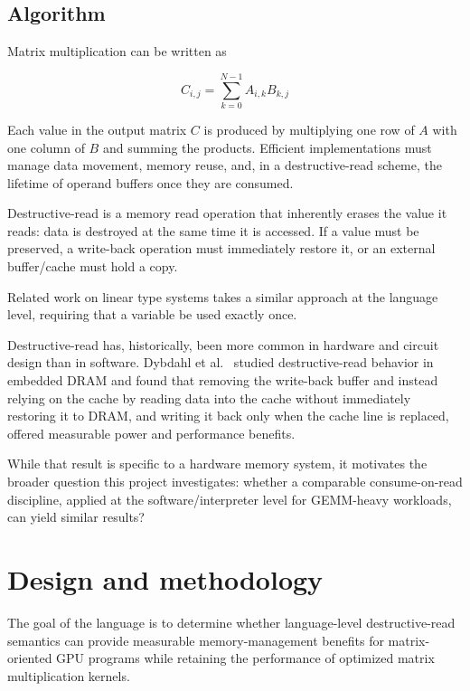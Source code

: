\documentclass[a4paper]{article}
\begin{document}
	\subsection{Algorithm}
	
	Matrix multiplication can be written as
	
	\begin{equation}
		C_{i,j} = \sum_{k=0}^{N-1} A_{i,k}B_{k,j}
	\end{equation}
	
	Each value in the output matrix $C$ is produced by multiplying one row of $A$ with one column of $B$ and summing the products. Efficient implementations must manage data movement, memory reuse, and, in a destructive-read scheme, the lifetime of operand buffers once they are consumed.
	
	Destructive-read is a memory read operation that inherently erases the value it reads: data is destroyed at the same time it is accessed. If a value must be preserved, a write-back operation must immediately restore it, or an external buffer/cache must hold a copy.
	
	Related work on linear type systems takes a similar approach at the language level, requiring that a variable be used exactly once.
	
	Destructive-read has, historically, been more common in hardware and circuit design than in software. Dybdahl et al.~\cite{DybdahlKGN06} studied destructive-read behavior in embedded DRAM and found that removing the write-back buffer and instead relying on the cache by reading data into the cache without immediately restoring it to DRAM, and writing it back only when the cache line is replaced, offered measurable power and performance benefits. 
	
	While that result is specific to a hardware memory system, it motivates the broader question this project investigates: whether a comparable consume-on-read discipline, applied at the software/interpreter level for GEMM-heavy workloads, can yield similar results?
	
	
	\section{Design and methodology}
	
	The goal of the language is to determine whether language-level destructive-read semantics can provide measurable memory-management benefits for matrix-oriented GPU programs while retaining the performance of optimized matrix multiplication kernels.
	
\end{document}
